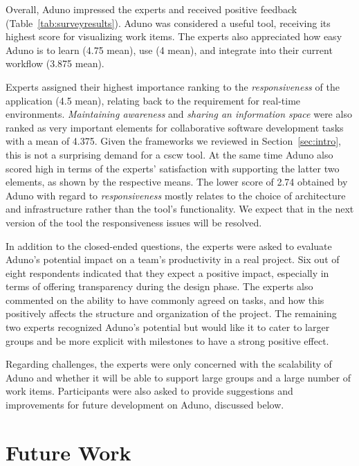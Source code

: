\documentclass[conference]{IEEEtran}
\begin{document}
Overall, Aduno impressed the experts and received positive feedback (Table~\ref{tab:surveyresults}). Aduno was considered a useful tool, receiving its highest score for visualizing work items. The experts also appreciated how easy Aduno is to learn (4.75 mean), use (4 mean), and integrate into their current workflow (3.875 mean).

Experts assigned their highest importance ranking to the \textit{responsiveness} of the application (4.5 mean), relating back to the requirement for real-time environments. \textit{Maintaining awareness} and \textit{sharing an information space} were also ranked as very important elements for collaborative software development tasks with a mean of 4.375. Given the frameworks we reviewed in Section~\ref{sec:intro}, this is not a surprising demand for a {\sc cscw} tool. At the same time Aduno also scored high in terms of the experts' satisfaction with supporting the latter two elements, as shown by the respective means. The lower score of 2.74 obtained by Aduno with regard to \textit{responsiveness} mostly relates to the choice of architecture and infrastructure rather than the tool's functionality. We expect that in the next version of the tool the responsiveness issues will be resolved. 


In addition to the closed-ended questions, the experts were asked to evaluate Aduno's potential impact on a team's productivity in a real project. Six out of eight respondents indicated that they expect a positive impact, especially in terms of offering transparency during the design phase. The experts also commented on the ability to have commonly agreed on tasks, and how this positively affects the structure and organization of the project. The remaining two experts recognized Aduno's potential but would like it to cater to larger groups and be more explicit with milestones to have a strong positive effect.

Regarding challenges, the experts were only concerned with the scalability of Aduno and whether it will be able to support large groups and a large number of work items. Participants were also asked to provide suggestions and improvements for future development on Aduno, discussed below.

\section{Future Work}
\label{sec:future}
\end{document}
